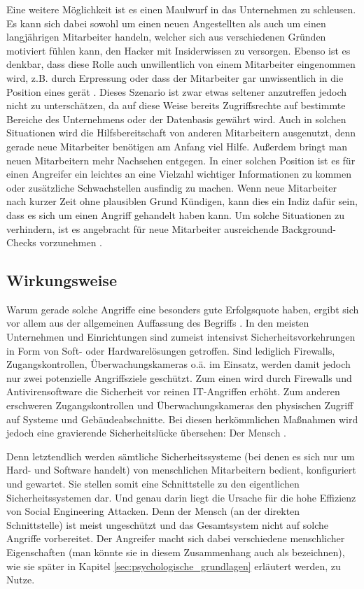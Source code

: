 Eine weitere Möglichkeit ist es einen Maulwurf in das Unternehmen zu schleusen.
Es kann sich dabei sowohl um einen neuen Angestellten als auch um einen langjährigen Mitarbeiter handeln, welcher sich aus verschiedenen Gründen motiviert fühlen kann, den Hacker mit Insiderwissen zu versorgen.
Ebenso ist es denkbar, dass diese Rolle auch unwillentlich von einem Mitarbeiter eingenommen wird, z.B. durch Erpressung oder dass der Mitarbeiter gar unwissentlich in die Position eines  gerät \citep{Dhanjani2009}.
Dieses Szenario ist zwar etwas seltener anzutreffen jedoch nicht zu unterschätzen, da auf diese
Weise bereits Zugriffsrechte auf bestimmte Bereiche des Unternehmens oder der Datenbasis gewährt wird.
Auch in solchen Situationen wird die Hilfsbereitschaft von anderen Mitarbeitern ausgenutzt, denn
gerade neue Mitarbeiter benötigen am Anfang viel Hilfe.
Außerdem bringt man neuen Mitarbeitern mehr Nachsehen entgegen.
In einer solchen Position ist es für einen Angreifer ein leichtes an eine Vielzahl wichtiger
Informationen zu kommen oder zusätzliche Schwachstellen ausfindig zu machen.
Wenn neue Mitarbeiter nach kurzer Zeit ohne plausiblen Grund Kündigen, kann dies ein Indiz dafür sein,
dass es sich um einen Angriff gehandelt haben kann.
Um solche Situationen zu verhindern, ist es angebracht für neue Mitarbeiter ausreichende Background-Checks vorzunehmen \citep{hacking-the-human}.

\subsection{Wirkungsweise}\label{sec:wirkungsweise}

Warum gerade solche Angriffe eine besonders gute Erfolgsquote haben, ergibt sich vor allem aus der allgemeinen Auffassung des Begriffs .
In den meisten Unternehmen und Einrichtungen sind zumeist intensivst Sicherheitsvorkehrungen in Form von Soft- oder Hardwarelösungen getroffen.
Sind lediglich Firewalls, Zugangskontrollen, Überwachungskameras o.ä. im Einsatz, werden damit jedoch nur zwei potenzielle Angriffsziele geschützt.
Zum einen wird durch Firewalls und Antivirensoftware die Sicherheit vor reinen IT-Angriffen erhöht.
Zum anderen erschweren Zugangskontrollen und Überwachungskameras den physischen Zugriff auf Systeme und Gebäudeabschnitte.
Bei diesen herkömmlichen Maßnahmen wird jedoch eine gravierende Sicherheitslücke übersehen: Der Mensch \citep{hacking-the-human}.

Denn letztendlich werden sämtliche Sicherheitssysteme (bei denen es sich nur um Hard- und Software handelt) von menschlichen Mitarbeitern bedient, konfiguriert und gewartet.
Sie stellen somit eine Schnittstelle zu den eigentlichen Sicherheitssystemen dar.
Und genau darin liegt die Ursache für die hohe Effizienz von Social Engineering Attacken.
Denn der Mensch (an der direkten Schnittstelle) ist meist ungeschützt und das Gesamtsystem nicht auf solche Angriffe vorbereitet.
Der Angreifer macht sich dabei verschiedene menschlicher Eigenschaften (man könnte sie in diesem Zusammenhang auch als  bezeichnen), wie sie später in Kapitel \vref{sec:psychologische_grundlagen} erläutert werden, zu Nutze.


